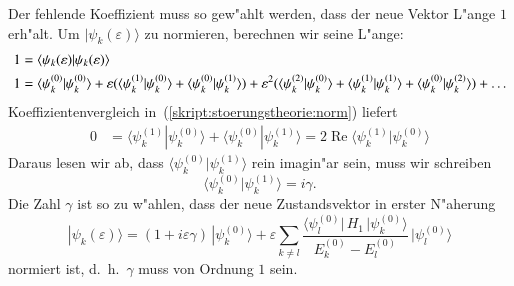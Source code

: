 Der fehlende Koeffizient muss so gew"ahlt werden, dass der neue
Vektor L"ange $1$ erh"alt.
Um $|\psi_k(\varepsilon)\rangle$ zu normieren, berechnen wir seine L"ange:
\begin{align}
1
&=
\langle\psi_k(\varepsilon)|\psi_k(\varepsilon)\rangle
\notag
\\
1
&=
\langle \psi_k^{(0)}|\psi_k^{(0)}\rangle
+
\varepsilon(
\langle \psi_k^{(1)}|\psi_k^{(0)}\rangle
+
\langle \psi_k^{(0)}|\psi_k^{(1)}\rangle
)
+
\varepsilon^2(
\langle \psi_k^{(2)}|\psi_k^{(0)}\rangle
+
\langle \psi_k^{(1)}|\psi_k^{(1)}\rangle
+
\langle \psi_k^{(0)}|\psi_k^{(2)}\rangle
)
+\dots
\label{skript:stoerungstheorie:norm}
\end{align}
Koeffizientenvergleich in~(\ref{skript:stoerungstheorie:norm}) liefert
\begin{align*}
0
&=
\langle \psi_k^{(1)}|\psi_k^{(0)}\rangle
+
\langle \psi_k^{(0)}|\psi_k^{(1)}\rangle
=
2\operatorname{Re}\langle \psi_k^{(1)}|\psi_k^{(0)}\rangle
\end{align*}
Daraus lesen wir ab, dass $\langle\psi_k^{(0)}|\psi_k^{(1)}\rangle$
rein imagin"ar sein, muss wir schreiben
\[
\langle\psi_k^{(0)}|\psi_k^{(1)}\rangle = i\gamma.
\]
Die Zahl $\gamma$ ist so zu w"ahlen, dass der neue Zustandsvektor
in erster N"aherung
\begin{equation}
|\psi_k(\varepsilon)\rangle
=
(1+i\varepsilon \gamma)
\,|\psi_k^{(0)}\rangle
+
\varepsilon
\sum_{k\ne l}
\frac{\langle \psi_l^{(0)}|\, H_1 \,|\psi_k^{(0)}\rangle}{E_k^{(0)}-E_l^{(0)}}
\,
|\psi_l^{(0)}\rangle
\end{equation}
normiert ist, d.~h.~$\gamma$ muss von Ordnung $1$ sein.

